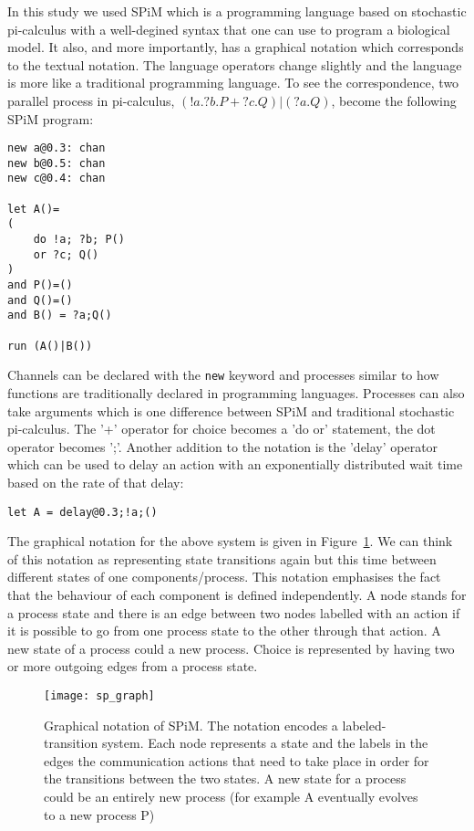 In this study we used SPiM which is a programming language based on
stochastic pi-calculus with a well-degined syntax that
one can use to program a biological model. It also, and more
importantly, has a graphical notation which corresponds to the textual
notation. The language operators change slightly and the language is
more like a traditional programming language. To see the
correspondence, two parallel process in pi-calculus, $ (!a.?b.P + ?c.Q) |
(?a.Q)$, become the following SPiM program:
\begin{verbatim}
new a@0.3: chan
new b@0.5: chan
new c@0.4: chan

let A()=
(
    do !a; ?b; P()
    or ?c; Q()
)
and P()=()
and Q()=()
and B() = ?a;Q()

run (A()|B())
\end{verbatim}
Channels can be declared with the \texttt{new} keyword and processes
similar to how functions are traditionally declared in programming
languages. Processes can also take arguments which is one difference
between SPiM and traditional stochastic pi-calculus. The '+' operator for choice becomes a 'do or' statement,
the dot operator becomes ';'. Another addition to the notation is the
'delay' operator which can be used to delay an action with an
exponentially distributed wait time based on the rate of that delay:
\begin{verbatim}
let A = delay@0.3;!a;()
\end{verbatim}


The graphical notation for the above
system is given in Figure~\ref{fig:sp_graph}. We can think of this
notation as representing state transitions again but this time between
different states of one components/process. This notation emphasises
the fact that the behaviour of each component is defined
independently. A node stands for a process state and there is an edge
between two nodes labelled with an action if it is possible to go from
one process state to the other through that action. A new state of a
process could a new process. Choice is represented by having two or
more outgoing edges from a process state.

\begin{figure}
\centering
\texttt{[image: sp\_graph]}
\caption[SPiM graphical notation]{Graphical notation of SPiM. The notation encodes a
  labeled-transition system. Each node represents a state and the
  labels in the edges the communication actions that need to take
  place in order for the transitions between the two states. A new
  state for a process could be an entirely new process (for example A
  eventually evolves to a new process P)}
\label{fig:sp_graph}
\end{figure}

